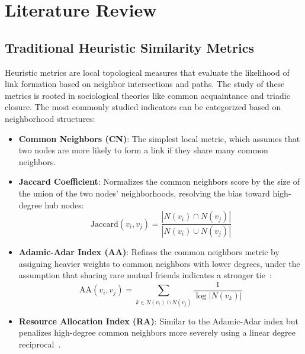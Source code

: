 
\chapter{Literature Review}

\ifpdf
    \graphicspath{{Chapter2/Figs/Raster/}{Chapter2/Figs/PDF/}{Chapter2/Figs/}}
\else
    \graphicspath{{Chapter2/Figs/Vector/}{Chapter2/Figs/}}
\fi

\section{Traditional Heuristic Similarity Metrics}

Heuristic metrics are local topological measures that evaluate the likelihood of link formation based on neighbor intersections and paths. The study of these metrics is rooted in sociological theories like common acquaintance and triadic closure. The most commonly studied indicators can be categorized based on neighborhood structures:

\begin{itemize}
    \item \textbf{Common Neighbors (CN)}: The simplest local metric, which assumes that two nodes are more likely to form a link if they share many common neighbors.
    \item \textbf{Jaccard Coefficient}: Normalizes the common neighbors score by the size of the union of the two nodes' neighborhoods, resolving the bias toward high-degree hub nodes:
    \begin{equation}
        \text{Jaccard}(v_i, v_j) = \frac{|N(v_i) \cap N(v_j)|}{|N(v_i) \cup N(v_j)|}
    \end{equation}
    \item \textbf{Adamic-Adar Index (AA)}: Refines the common neighbors metric by assigning heavier weights to common neighbors with lower degrees, under the assumption that sharing rare mutual friends indicates a stronger tie~\citep{adamic2003friends}:
    \begin{equation}
        \text{AA}(v_i, v_j) = \sum_{k \in N(v_i) \cap N(v_j)} \frac{1}{\log |N(v_k)|}
    \end{equation}
    \item \textbf{Resource Allocation Index (RA)}: Similar to the Adamic-Adar index but penalizes high-degree common neighbors more severely using a linear degree reciprocal~\citep{zhou2009unbiased}.
\end{itemize}


